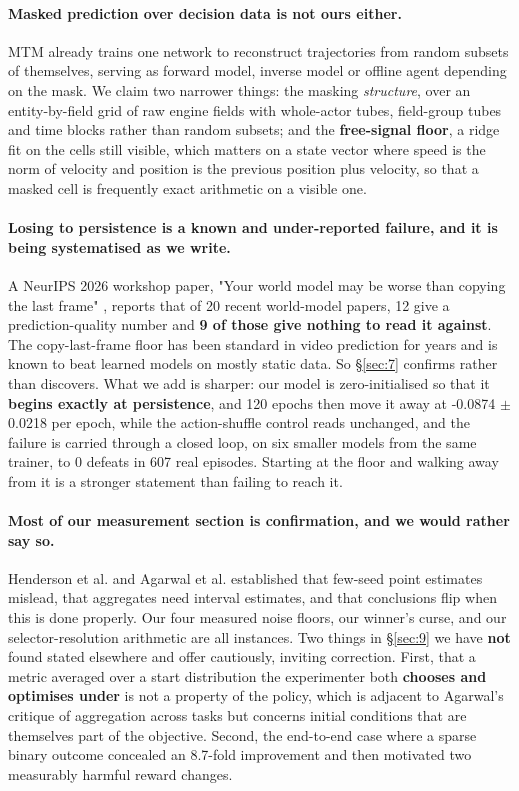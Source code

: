 \documentclass[11pt]{article}
\begin{document}
\paragraph{Masked prediction over decision data is not ours either.} MTM \cite{wu2023mtm} already trains one network to reconstruct trajectories from random subsets of themselves, serving as forward model, inverse model or offline agent depending on the mask. We claim two narrower things: the masking \emph{structure}, over an entity-by-field grid of raw engine fields with whole-actor tubes, field-group tubes and time blocks rather than random subsets; and the \textbf{free-signal floor}, a ridge fit on the cells still visible, which matters on a state vector where speed is the norm of velocity and position is the previous position plus velocity, so that a masked cell is frequently exact arithmetic on a visible one.

\paragraph{Losing to persistence is a known and under-reported failure, and it is being systematised as we write.} A NeurIPS 2026 workshop paper, "Your world model may be worse than copying the last frame" \cite{surazhsky2026copyframe}, reports that of 20 recent world-model papers, 12 give a prediction-quality number and \textbf{9 of those give nothing to read it against}. The copy-last-frame floor has been standard in video prediction for years and is known to beat learned models on mostly static data. So \S\ref{sec:7} confirms rather than discovers. What we add is sharper: our model is zero-initialised so that it \textbf{begins exactly at persistence}, and 120 epochs then move it away at -0.0874 $\pm$ 0.0218 per epoch, while the action-shuffle control reads unchanged, and the failure is carried through a closed loop, on six smaller models from the same trainer, to 0 defeats in 607 real episodes. Starting at the floor and walking away from it is a stronger statement than failing to reach it.

\paragraph{Most of our measurement section is confirmation, and we would rather say so.} Henderson et al. \cite{henderson2018matters} and Agarwal et al. \cite{agarwal2021precipice} established that few-seed point estimates mislead, that aggregates need interval estimates, and that conclusions flip when this is done properly. Our four measured noise floors, our winner's curse, and our selector-resolution arithmetic are all instances. Two things in \S\ref{sec:9} we have \textbf{not} found stated elsewhere and offer cautiously, inviting correction. First, that a metric averaged over a start distribution the experimenter both \textbf{chooses and optimises under} is not a property of the policy, which is adjacent to Agarwal's critique of aggregation across tasks but concerns initial conditions that are themselves part of the objective. Second, the end-to-end case where a sparse binary outcome concealed an 8.7-fold improvement and then motivated two measurably harmful reward changes.
\end{document}
